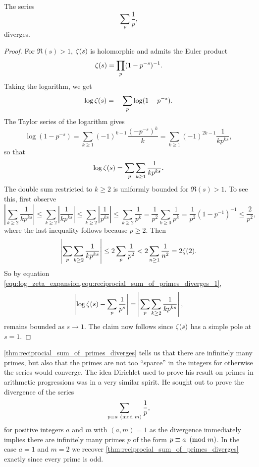       \begin{theorem}\label{thm:reciprocial_sum_of_primes_diverges}
        The series
        \[
          \sum_{p}\frac{1}{p},
        \]
        diverges.
      \end{theorem}
      \begin{proof}
        For $\Re(s) > 1$, $\zeta(s)$ is holomorphic and admits the Euler product
        \[
          \zeta(s) = \prod_{p}(1-p^{-s})^{-1}.
        \]
        Taking the logarithm, we get
        \[
          \log\zeta(s) = -\sum_{p}\log(1-p^{-s}).
        \]
        The Taylor series of the logarithm gives
        \[
          \log(1-p^{-s}) = \sum_{k \ge 1}(-1)^{k-1}\frac{(-p^{-s})^{k}}{k} = \sum_{k \ge 1}(-1)^{2k-1}\frac{1}{kp^{ks}},
        \]
        so that
        \begin{equation}\label{equ:log_zeta_expansion}
          \log\zeta(s) = \sum_{p}\sum_{k \ge 1}\frac{1}{kp^{ks}}.
        \end{equation}
        The double sum restricted to $k \ge 2$ is uniformly bounded for $\Re(s) > 1$. To see this, first observe
        \[
          \left|\sum_{k \ge 2}\frac{1}{kp^{ks}}\right| \le \sum_{k \ge 2}\left|\frac{1}{kp^{ks}}\right| \le \sum_{k \ge 2}\left|\frac{1}{p^{ks}}\right| \le \sum_{k \ge 2}\frac{1}{p^{k}} = \frac{1}{p^{2}}\sum_{k \ge 0}\frac{1}{p^{k}} = \frac{1}{p^{2}}(1-p^{-1})^{-1} \le \frac{2}{p^{2}},
        \]
        where the last inequality follows because $p \ge 2$. Then
        \begin{equation}\label{equ:reciprocial_sum_of_primes_diverges_1}
          \left|\sum_{p}\sum_{k \ge 2}\frac{1}{kp^{ks}}\right| \le 2\sum_{p}\frac{1}{p^{2}} < 2\sum_{n \ge 1}\frac{1}{n^{2}} = 2\zeta(2).
        \end{equation}
        So by equation \cref{equ:log_zeta_expansion,equ:reciprocial_sum_of_primes_diverges_1},
        \[
          \left|\log\zeta(s)-\sum_{p}\frac{1}{p^{s}}\right| = \left|\sum_{p}\sum_{k \ge 2}\frac{1}{kp^{ks}}\right|,
        \]
        remains bounded as $s \to 1$. The claim now follows since $\zeta(s)$ has a simple pole at $s = 1$.
      \end{proof}

      \cref{thm:reciprocial_sum_of_primes_diverges} tells us that there are infinitely many primes, but also that the primes are not too ``sparce'' in the integers for otherwise the series would converge. The idea Dirichlet used to prove his result on primes in arithmetic progressions was in a very similar spirit. He sought out to prove the divergence of the series
      \[
        \sum_{p \equiv a \ \left(\text{mod }m\right)}\frac{1}{p},
      \]
      for positive integers $a$ and $m$ with $(a,m) = 1$ as the divergence immediately implies there are infinitely many primes $p$ of the form $p \equiv a \ \left(\text{mod }m\right)$. In the case $a = 1$ and $m = 2$ we recover \cref{thm:reciprocial_sum_of_primes_diverges} exactly since every prime is odd.

